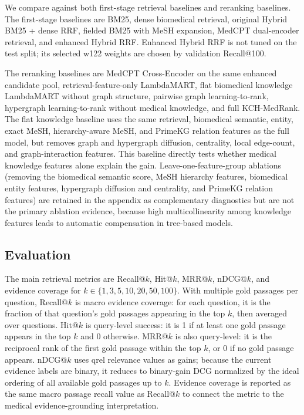 We compare against both first-stage retrieval baselines and reranking baselines. The first-stage baselines are BM25, dense biomedical retrieval, original Hybrid BM25 + dense RRF, fielded BM25 with MeSH expansion, MedCPT dual-encoder retrieval, and enhanced Hybrid RRF. Enhanced Hybrid RRF is not tuned on the test split; its selected w122 weights are chosen by validation Recall@100.

The reranking baselines are MedCPT Cross-Encoder on the same enhanced candidate pool, retrieval-feature-only LambdaMART, flat biomedical knowledge LambdaMART without graph structure, pairwise graph learning-to-rank, hypergraph learning-to-rank without medical knowledge, and full KCH-MedRank. The flat knowledge baseline uses the same retrieval, biomedical semantic, entity, exact MeSH, hierarchy-aware MeSH, and PrimeKG relation features as the full model, but removes graph and hypergraph diffusion, centrality, local edge-count, and graph-interaction features. This baseline directly tests whether medical knowledge features alone explain the gain. Leave-one-feature-group ablations (removing the biomedical semantic score, MeSH hierarchy features, biomedical entity features, hypergraph diffusion and centrality, and PrimeKG relation features) are retained in the appendix as complementary diagnostics but are not the primary ablation evidence, because high multicollinearity among knowledge features leads to automatic compensation in tree-based models.

\subsection{Evaluation}

The main retrieval metrics are Recall@$k$, Hit@$k$, MRR@$k$, nDCG@$k$, and evidence coverage for $k \in \{1,3,5,10,20,50,100\}$. With multiple gold passages per question, Recall@$k$ is macro evidence coverage: for each question, it is the fraction of that question's gold passages appearing in the top $k$, then averaged over questions. Hit@$k$ is query-level success: it is 1 if at least one gold passage appears in the top $k$ and 0 otherwise. MRR@$k$ is also query-level: it is the reciprocal rank of the first gold passage within the top $k$, or 0 if no gold passage appears. nDCG@$k$ uses qrel relevance values as gains; because the current evidence labels are binary, it reduces to binary-gain DCG normalized by the ideal ordering of all available gold passages up to $k$. Evidence coverage is reported as the same macro passage recall value as Recall@$k$ to connect the metric to the medical evidence-grounding interpretation.

